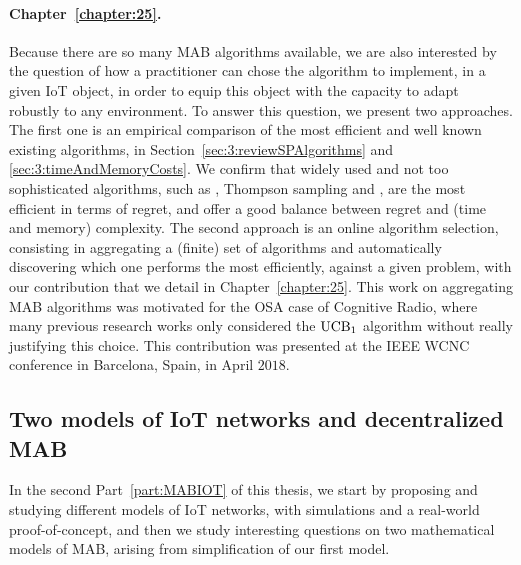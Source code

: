 \paragraph{Chapter~\ref{chapter:25}.}
%
Because there are so many MAB algorithms available, we are also interested by the question of how a practitioner can chose the algorithm to implement, in a given IoT object, in order to equip this object with the capacity to adapt robustly to any environment.
To answer this question, we present two approaches.
The first one is an empirical comparison of the most efficient and well known existing algorithms, in Section~\ref{sec:3:reviewSPAlgorithms} and \ref{sec:3:timeAndMemoryCosts}.
We confirm that widely used and not too sophisticated algorithms, such as \UCB{} \cite{Auer02}, Thompson sampling \cite{Thompson33} and \klUCB{} \cite{KLUCBJournal}, are the most efficient in terms of regret, and offer a good balance between regret and (time and memory) complexity.
The second approach is an online algorithm selection, consisting in aggregating a (finite) set of algorithms and automatically discovering which one performs the most efficiently, against a given problem, with our contribution \Aggr{} that we detail in Chapter~\ref{chapter:25}.
This work on aggregating MAB algorithms was motivated for the OSA case of Cognitive Radio, where many previous research works only considered the $\mathrm{UCB}_1$ algorithm without really justifying this choice.
This contribution was presented at the IEEE WCNC conference in Barcelona, Spain, in April $2018$.


\subsection{Two models of IoT networks and decentralized MAB}

In the second Part~\ref{part:MABIOT} of this thesis, we start by proposing and studying different models of IoT networks, with simulations and a real-world proof-of-concept, and then we study interesting questions on two mathematical models of MAB, arising from simplification of our first model.


